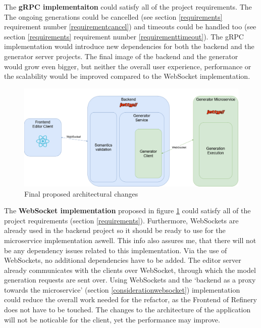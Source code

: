 	The \textbf{gRPC implementaiton} could satisfy all of the project requirements. The The ongoing generations could be cancelled (see section \ref{requirements} 
	requirement number \ref{requirementcancel}) and timeouts could 
	be handled too (see section \ref{requirements} 
	requirement number \ref{requirementtimeout}). 
	The gRPC implementation would introduce new dependencies for both the backend and the generator server projects.
	The final image of the backend and the generator would grow even bigger, but neither the overall user experience, performance
	or the scalability would be improved compared to the WebSocket implementation. 

	\begin{figure}[h!]
		\begin{center}
			\includegraphics[scale=0.3]{include/imgs/arch_plan.png}
			\caption{Final proposed architectural changes}
			\label{archplan}
		\end{center}
	\end{figure}

	The \textbf{WebSocket implementation} proposed in figure \ref{archplan} could satisfy all of the project requirements (section \ref{requirements}). 
	Furthermore, WebSockets are already used 
	in the backend project so it should be ready to use for the microservice implementation aswell.
	This info also assures me, that there will not be any dependency issues related to this implementation. 
	Via the use of 
	WebSockets, no additional dependencies have to be added. The editor server already communicates 
	with the clients over WebSocket, through which
	the model generation requests are sent over. 
	Using WebSockets and the `backend as a proxy towards the microservice' (section \ref{considerationwebsocket}) implementation could 
	reduce the overall work needed for the refactor, 
	as the Frontend of Refinery 
	does not have to be touched. 
	The changes to the architecture of the application will not be noticable for the client, yet the performance may improve.

